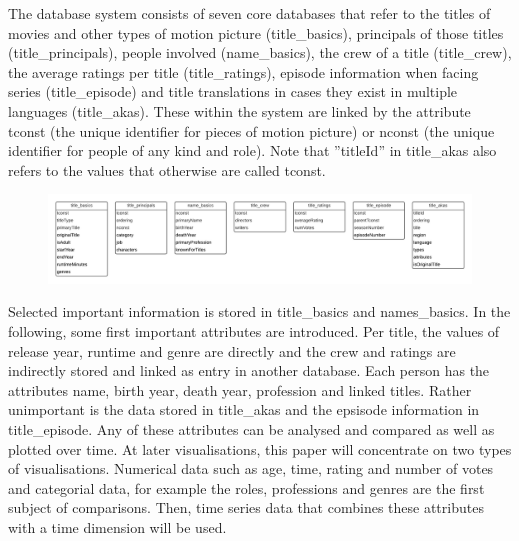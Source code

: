 The database system consists of seven core databases that refer to the titles of movies and other types of motion picture (title\_basics), principals of those titles (title\_principals), people involved (name\_basics), the crew of a title (title\_crew), the average ratings per title (title\_ratings), episode information when facing series (title\_episode) and title translations in cases they exist in multiple languages (title\_akas). These within the system are linked by the attribute tconst (the unique identifier for pieces of motion picture) or nconst (the unique identifier for people of any kind and role). Note that ''titleId'' in title\_akas also refers to the values that otherwise are called tconst.

\begin{figure}[caption={Structure and Atrributes of IMDb}, label={fig:imdbStructure}]
	{\includegraphics[width=15cm]{figures/ds.pdf}}
\end{figure}

Selected important information is stored in title\_basics and names\_basics. In the following, some first important attributes are introduced. Per title, the values of release year, runtime and genre are directly and the crew and ratings are indirectly stored and linked as entry in another database. Each person has the attributes name, birth year, death year, profession and linked titles. Rather unimportant is the data stored in title\_akas and the epsisode information in title\_episode. Any of these attributes can be analysed and compared as well as plotted over time. At later visualisations, this paper will concentrate on two types of visualisations. Numerical data such as age, time, rating and number of votes and categorial data, for example the roles, professions and genres are the first subject of comparisons. Then, time series data that combines these attributes with a time dimension will be used. 

